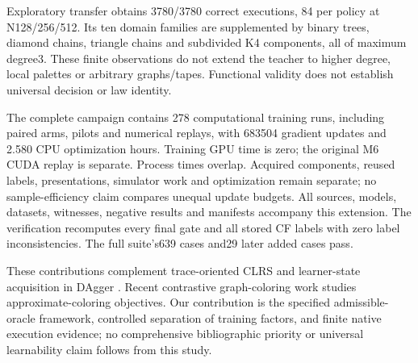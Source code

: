 Exploratory transfer obtains 3780/3780 correct executions, 84 per policy
at N128/256/512. Its ten domain families are supplemented by binary
trees, diamond chains, triangle chains and subdivided K4 components, all
of maximum degree3. These finite observations do not extend the teacher
to higher degree, local palettes or arbitrary graphs/tapes. Functional
validity does not establish universal decision or law identity.

The complete campaign contains 278 computational training runs,
including paired arms, pilots and numerical replays, with 683504
gradient updates and 2.580 CPU optimization hours. Training GPU time is
zero; the original M6 CUDA replay is separate. Process times overlap.
Acquired components, reused labels, presentations, simulator work and
optimization remain separate; no sample-efficiency claim compares
unequal update budgets. All sources, models, datasets, witnesses,
negative results and manifests accompany this extension. The
verification recomputes every final gate and all stored CF labels with
zero label inconsistencies. The full suite's639 cases and29 later added
cases pass.

These contributions complement trace-oriented CLRS
\citet{velickovic2022clrs} and learner-state acquisition in DAgger
\citet{ross2011dagger}. Recent contrastive graph-coloring work
\citet{le2026contrastive} studies approximate-coloring objectives. Our
contribution is the specified admissible-oracle framework, controlled
separation of training factors, and finite native execution evidence; no
comprehensive bibliographic priority or universal learnability claim
follows from this study.
